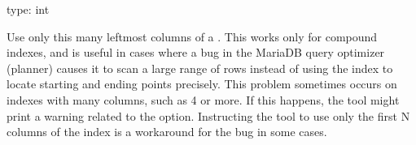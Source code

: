 \documentclass[letterpaper,10pt,english]{sphinxmanual}
\begin{document}

\begin{fulllineitems}
\label{\detokenize{mariadb-schema-change:cmdoption-mariadb-schema-change-chunk-index-columns}}
type: int

Use only this many left\sphinxhyphen{}most columns of a {\hyperref[\detokenize{mariadb-schema-change:cmdoption-mariadb-schema-change-chunk-index}]{}}.  This works
only for compound indexes, and is useful in cases where a bug in the MariaDB
query optimizer (planner) causes it to scan a large range of rows instead
of using the index to locate starting and ending points precisely.  This
problem sometimes occurs on indexes with many columns, such as 4 or more.
If this happens, the tool might print a warning related to the
{\hyperref[\detokenize{mariadb-schema-change:cmdoption-mariadb-schema-change-no-check-plan}]{}} option.  Instructing the tool to use only the first
N columns of the index is a workaround for the bug in some cases.

\end{fulllineitems}

\end{document}
